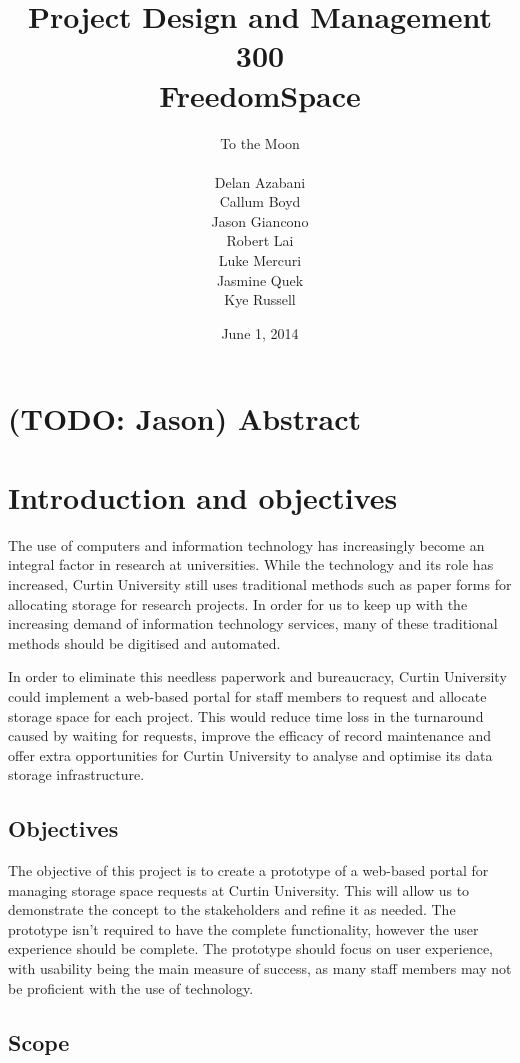 \documentclass[a4paper,titlepage,12pt]{article}
\title{Project Design and Management 300\\FreedomSpace}
\date{June 1, 2014}
\author{
	To the Moon \\
	\hspace{10 mm} \\
	Delan Azabani \\
	Callum Boyd \\
	Jason Giancono \\
	Robert Lai \\
	Luke Mercuri \\
	Jasmine Quek \\
	Kye Russell \\
}
\let\stdsection\section
\renewcommand\section{\newpage\stdsection}
\begin{document}
\maketitle
{}
\tableofcontents
\listoffigures
{}

\section{(TODO: Jason) Abstract}

\section{Introduction and objectives}

The use of computers and information technology has increasingly become an
integral factor in research at universities. While the technology and its role
has increased, Curtin University still uses traditional methods such as paper
forms for allocating storage for research projects. In order for us to keep up
with the increasing demand of information technology services, many of these
traditional methods should be digitised and automated.

In order to eliminate this needless paperwork and bureaucracy, Curtin
University could implement a web-based portal for staff members to request and
allocate storage space for each project. This would reduce time loss in the
turnaround caused by waiting for requests, improve the efficacy of record
maintenance and offer extra opportunities for Curtin University to analyse and
optimise its data storage infrastructure.

\subsection{Objectives}

The objective of this project is to create a prototype of a web-based portal
for managing storage space requests at Curtin University. This will allow us to
demonstrate the concept to the stakeholders and refine it as needed. The
prototype isn't required to have the complete functionality, however the user
experience should be complete. The prototype should focus on user experience,
with usability being the main measure of success, as many staff members may not
be proficient with the use of technology.

\subsection{Scope}
\end{document}
